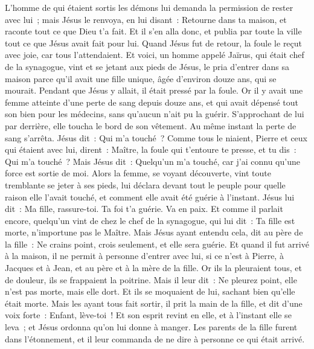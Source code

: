 \begin{multicols}{2}
L'homme de qui étaient sortis les démons lui demanda la permission de rester avec lui~; mais Jésus le renvoya, en lui disant~:
Retourne dans ta maison, et raconte tout ce que Dieu t'a fait. Et il s'en alla donc, et publia par toute la ville tout ce que Jésus avait fait pour lui.
Quand Jésus fut de retour, la foule le reçut avec joie, car tous l'attendaient.
Et voici, un homme appelé Jaïrus, qui était chef de la synagogue, vint et se jetant aux pieds de Jésus, le pria d'entrer dans sa maison
parce qu'il avait une fille unique, âgée d'environ douze ans, qui se mourait. Pendant que Jésus y allait, il était pressé par la foule.
Or il y avait une femme atteinte d'une perte de sang depuis douze ans, et qui avait dépensé tout son bien pour les médecins, sans qu'aucun n'ait pu la guérir.
S'approchant de lui par derrière, elle toucha le bord de son vêtement. Au même instant la perte de sang s'arrêta.
Jésus dit~: Qui m'a touché~? Comme tous le niaient, Pierre et ceux qui étaient avec lui, dirent~: Maître, la foule qui t'entoure te presse, et tu dis~: Qui m'a touché~?
Mais Jésus dit~: Quelqu'un m'a touché, car j'ai connu qu'une force est sortie de moi.
Alors la femme, se voyant découverte, vint toute tremblante se jeter à ses pieds, lui déclara devant tout le peuple pour quelle raison elle l'avait touché, et comment elle avait été guérie à l'instant.
Jésus lui dit~: Ma fille, rassure-toi. Ta foi t'a guérie. Va en paix.
Et comme il parlait encore, quelqu'un vint de chez le chef de la synagogue, qui lui dit~: Ta fille est morte, n'importune pas le Maître.
Mais Jésus ayant entendu cela, dit au père de la fille~: Ne crains point, crois seulement, et elle sera guérie.
Et quand il fut arrivé à la maison, il ne permit à personne d'entrer avec lui, si ce n'est à Pierre, à Jacques et à Jean, et au père et à la mère de la fille.
Or ils la pleuraient tous, et de douleur, ils se frappaient la poitrine. Mais il leur dit~: Ne pleurez point, elle n'est pas morte, mais elle dort.
Et ils se moquaient de lui, sachant bien qu'elle était morte.
Mais les ayant tous fait sortir, il prit la main de la fille, et dit d'une voix forte~: Enfant, lève-toi~!
Et son esprit revint en elle, et à l'instant elle se leva~; et Jésus ordonna qu'on lui donne à manger.
Les parents de la fille furent dans l'étonnement, et il leur commanda de ne dire à personne ce qui était arrivé.

\end{multicols}
